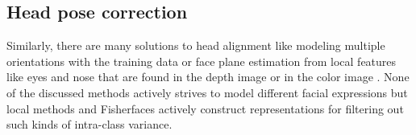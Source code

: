 \subsection{Head pose correction}
Similarly, there are many solutions to head alignment like modeling multiple orientations with the training data \cite{Georghiades01, pentland1994} or face plane estimation from local features like eyes and nose that are found in the depth image \cite{Gurbuz12, Jasek2012} or in the color image \cite{beymer1994}.
None of the discussed methods actively strives to model different facial expressions but local methods and Fisherfaces actively construct representations for filtering out such kinds of intra-class variance.


